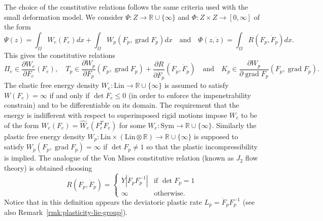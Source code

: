 \documentclass[a4paper,10pt,oneside]{amsbook}
\numberwithin{section}{chapter}
\numberwithin{equation}{chapter}
\theoremstyle{definition}
\DeclareMathOperator{\grad}{grad}
\newcommand{\dind}[2]{\frac{\partial #1}{\partial #2}}
\begin{document}
The choice of the constitutive relations follows the same criteria used with the small deformation model. We consider $\Psi\colon Z\to\mathbb{R}\cup\{\infty\}$ and $\Phi\colon Z\times Z\to[0,\infty]$ of the form
\[
\Psi(z)=\int_\Omega W_e(F_e)dx+\int_\Omega W_p(F_p,\grad F_p)dx\quad\text{and}\quad\Phi(z,\dot z)=\int_\Omega R(F_p,\dot F_p)dx.
\]
This gives the constitutive relations
\[
\Pi_e\in\dind{W_e}{F_e}(F_e),\quad T_p\in\dind{W_p}{F_p}(F_p,\grad F_p)+\dind{R}{\dot F_p}(F_p,\dot F_p)\quad\text{and}\quad K_p\in\dind{W_p}{\grad F_p}(F_p,\grad F_p).
\]
The elastic free energy density $W_e\colon\text{Lin}\to\mathbb{R}\cup\{\infty\}$ is assumed to satisfy $W(F_e)=\infty$ if and only if $\det F_e\le0$ (in order to enforce the impenetrability constrain) and to be differentiable on its domain. The requirement that the energy is indifferent with respect to superimposed rigid motions impose $W_e$ to be of the form $W_e(F_e)=\hat{W}_e(F_e^TF_e)$ for some $W_e\colon\text{Sym}\to\mathbb{R}\cup\{\infty\}$. Similarly the plastic free energy density $W_p\colon\text{Lin}\times\left(\text{Lin}\otimes\mathbb{R}\right)\to\mathbb{R}\cup\{\infty\}$ is supposed to satisfy $W_p(F_p,\grad F_p)=\infty$ if $\det F_p\neq1$ so that the plastic incompressibility is implied. The analogue of the Von Mises constitutive relation (known as $J_2$ flow theory) is obtained choosing
\begin{equation}
\label{eqn:R-large-3D}
R(F_p,\dot F_p)=\begin{cases}
Y|\dot F_pF_p^{-1}| & \text{if $\det F_p=1$} \\
\infty & \text{otherwise}.
\end{cases}
\end{equation}
Notice that in this definition appears the deviatoric plastic rate $L_p=\dot F_pF_p^{-1}$ (see also Remark~\ref{rmk:plasticity-lie-group}).
\end{document}
